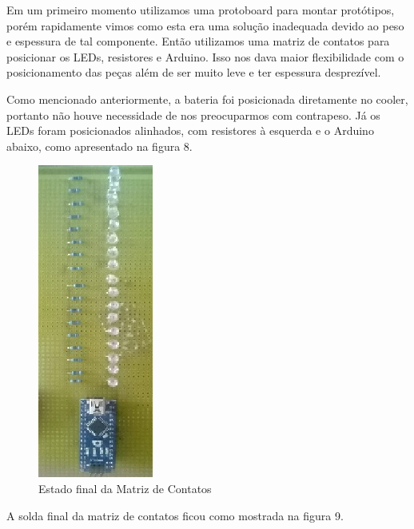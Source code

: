 Em um primeiro momento utilizamos uma protoboard para montar protótipos, porém rapidamente vimos como esta era uma solução inadequada devido ao peso e espessura de tal componente. Então utilizamos uma matriz de contatos para posicionar os LEDs, resistores e Arduino. Isso nos dava maior flexibilidade com o posicionamento das peças além de ser muito leve e ter espessura desprezível.

Como mencionado anteriormente, a bateria foi posicionada diretamente no cooler, portanto não houve necessidade de nos preocuparmos com contrapeso. Já os LEDs foram posicionados alinhados, com resistores à esquerda e o Arduino abaixo, como apresentado na figura 8.

\begin{figure}[!h]
	\centering
	\includegraphics{./placa_cima.jpg}
	\caption[Estado final da Matriz de Contatos]{Estado final da Matriz de Contatos}
	\label{fig:placa_cima}
\end{figure}

A solda final da matriz de contatos ficou como mostrada na figura 9.

